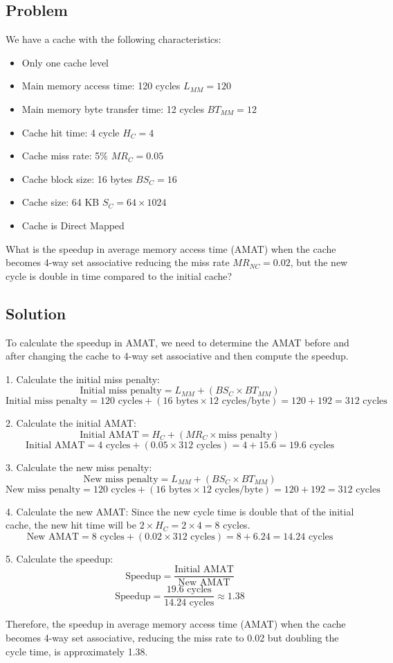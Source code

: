 \subsection*{Problem}

We have a cache with the following characteristics:
\begin{itemize}
    \item Only one cache level
    \item Main memory access time: 120 cycles $L_{MM}=120$
    \item Main memory byte transfer time: 12 cycles $BT_{MM}=12$
    \item Cache hit time: 4 cycle $H_{C}=4$
    \item Cache miss rate: 5\% $MR_{C}=0.05$
    \item Cache block size: 16 bytes $BS_{C}=16$
    \item Cache size: 64 KB $S_{C}=64 \times 1024$
    \item Cache is Direct Mapped
\end{itemize}

What is the speedup in average memory access time (AMAT)  when the cache becomes 4-way set associative reducing the miss rate $MR_{NC}=0.02$, but the new cycle is double in time compared to the initial cache?

\subsection*{Solution}

To calculate the speedup in AMAT, we need to determine the AMAT before and after changing the cache to 4-way set associative and then compute the speedup.

1. Calculate the initial miss penalty:
\[
\text{Initial miss penalty} = L_{MM} + (BS_{C} \times BT_{MM})
\]
\[
\text{Initial miss penalty} = 120 \text{ cycles} + (16 \text{ bytes} \times 12 \text{ cycles/byte}) = 120 + 192 = 312 \text{ cycles}
\]

2. Calculate the initial AMAT:
\[
\text{Initial AMAT} = H_{C} + (MR_{C} \times \text{miss penalty})
\]
\[
\text{Initial AMAT} = 4 \text{ cycles} + (0.05 \times 312 \text{ cycles}) = 4 + 15.6 = 19.6 \text{ cycles}
\]

3. Calculate the new miss penalty:
\[
\text{New miss penalty} = L_{MM} + (BS_{C} \times BT_{MM})
\]
\[
\text{New miss penalty} = 120 \text{ cycles} + (16 \text{ bytes} \times 12 \text{ cycles/byte}) = 120 + 192 = 312 \text{ cycles}
\]

4. Calculate the new AMAT:
Since the new cycle time is double that of the initial cache, the new hit time will be $2 \times H_{C} = 2 \times 4 = 8$ cycles.
\[
\text{New AMAT} = 8 \text{ cycles} + (0.02 \times 312 \text{ cycles}) = 8 + 6.24 = 14.24 \text{ cycles}
\]

5. Calculate the speedup:
\[
\text{Speedup} = \frac{\text{Initial AMAT}}{\text{New AMAT}}
\]
\[
\text{Speedup} = \frac{19.6 \text{ cycles}}{14.24 \text{ cycles}} \approx 1.38
\]

Therefore, the speedup in average memory access time (AMAT) when the cache becomes 4-way set associative, reducing the miss rate to 0.02 but doubling the cycle time, is approximately 1.38.
